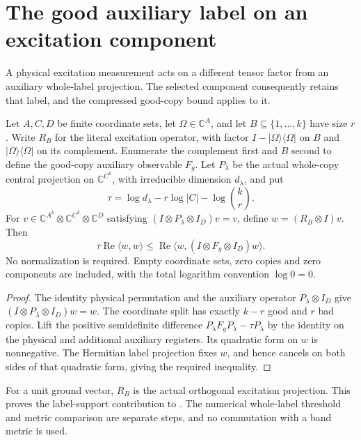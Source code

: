 \section{The good auxiliary label on an excitation component}
\label{sec:replica_good_auxiliary_label_bound}

A physical excitation measurement acts on a different tensor factor from
an auxiliary whole-label projection. The selected component consequently
retains that label, and the compressed good-copy bound applies to it.

\begin{theorem}
\label{thm:replica_good_auxiliary_label_bound}
\leanok
Let $A,C,D$ be finite coordinate sets, let $\Omega\in\mathbb C^A$, and
let $B\subseteq\{1,\ldots,k\}$ have size $r$. Write $R_B$ for the literal
excitation operator, with factor $I-|\Omega\rangle\langle\Omega|$ on $B$
and $|\Omega\rangle\langle\Omega|$ on its complement. Enumerate the
complement first and $B$ second to define the good-copy auxiliary observable
$F_g$. Let $P_\lambda$ be the actual whole-copy central projection on
$\mathbb C^{C^k}$, with irreducible dimension $d_\lambda$, and put
\[
 \tau=\log d_\lambda-r\log|C|-\log\binom{k}{r}.
\]
For $v\in\mathbb C^{A^k}\otimes\mathbb C^{C^k}\otimes\mathbb C^D$
satisfying $(I\otimes P_\lambda\otimes I_D)v=v$, define
$w=(R_B\otimes I)v$. Then
\[
 \tau\operatorname{Re}\langle w,w\rangle
 \le\operatorname{Re}\langle w,(I\otimes F_g\otimes I_D)w\rangle.
\]
No normalization is required. Empty coordinate sets, zero copies and zero
components are included, with the total logarithm convention $\log0=0$.
\end{theorem}
\begin{proof}
\leanok
{}
The identity physical permutation and the auxiliary operator
$P_\lambda\otimes I_D$ give
$(I\otimes P_\lambda\otimes I_D)w=w$. The coordinate split has exactly
$k-r$ good and $r$ bad copies. Lift the positive semidefinite difference
$P_\lambda F_gP_\lambda-\tau P_\lambda$ by the identity on the physical
and additional auxiliary registers. Its quadratic form on $w$ is
nonnegative. The Hermitian label projection fixes $w$, and hence cancels
on both sides of that quadratic form, giving the required inequality.
\end{proof}

For a unit ground vector, $R_B$ is the actual orthogonal excitation
projection. This proves the label-support contribution to
\cite[Section~7, equation \textup{(comparator:good-auxiliary)}]{OpenAI2026AreaLaw}.
The numerical whole-label threshold and metric comparison are separate
steps, and no commutation with a band metric is used.
